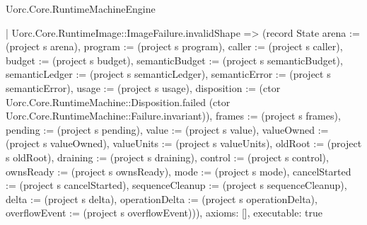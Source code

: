 \begin{lexlean}{Uorc.Core.RuntimeMachineEngine}
\begin{semanticmodule}
{    | Uorc.Core.RuntimeImage::ImageFailure.invalidShape => (record State {arena := (project s arena), program := (project s program), caller := (project s caller), budget := (project s budget), semanticBudget := (project s semanticBudget), semanticLedger := (project s semanticLedger), semanticError := (project s semanticError), usage := (project s usage), disposition := (ctor Uorc.Core.RuntimeMachine::Disposition.failed (ctor Uorc.Core.RuntimeMachine::Failure.invariant)), frames := (project s frames), pending := (project s pending), value := (project s value), valueOwned := (project s valueOwned), valueUnits := (project s valueUnits), oldRoot := (project s oldRoot), draining := (project s draining), control := (project s control), ownsReady := (project s ownsReady), mode := (project s mode), cancelStarted := (project s cancelStarted), sequenceCleanup := (project s sequenceCleanup), delta := (project s delta), operationDelta := (project s operationDelta), overflowEvent := (project s overflowEvent)})),
  axioms: [],
  executable: true
}


\end{semanticmodule}
\end{lexlean}
